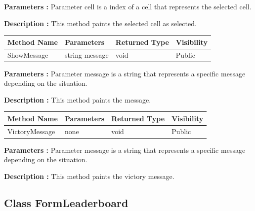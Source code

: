\documentclass[12pt]{article}
\begin{document}
    \textbf{Parameters :} Parameter cell is a index of a cell that represents the selected cell.

    \textbf{Description :} This method paints the selected cell as selected.

    \begin{table}[H]
        \begin{tabular}{|l|l|l|l|}
            \hline
            \rowcolor[HTML]{EFEFEF}
            \cellcolor[HTML]{EFEFEF}\textbf{Method Name} & \textbf{Parameters} & \textbf{Returned Type} & \textbf{Visibility} \\ \hline
            ShowMessage                                  & string message      & void                   & Public              \\ \hline
        \end{tabular}
    \end{table}

    \textbf{Parameters :} Parameter message is a string that represents a specific message depending on the situation.

    \textbf{Description :} This method paints the message.

    \begin{table}[H]
        \begin{tabular}{|l|l|l|l|}
            \hline
            \rowcolor[HTML]{EFEFEF}
            \cellcolor[HTML]{EFEFEF}\textbf{Method Name} & \textbf{Parameters} & \textbf{Returned Type} & \textbf{Visibility} \\ \hline
            VictoryMessage                               & none                & void                   & Public              \\ \hline
        \end{tabular}
    \end{table}

    \textbf{Parameters :} Parameter message is a string that represents a specific message depending on the situation.

    \textbf{Description :} This method paints the victory message.

    \newpage


    \subsection{Class FormLeaderboard}
\end{document}
